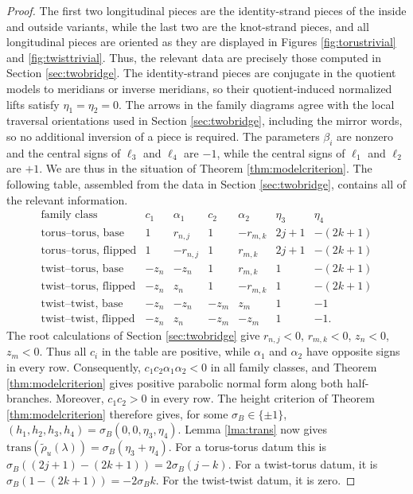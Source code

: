 \documentclass{article}
\theoremstyle{plain}
\theoremstyle{definition}
\theoremstyle{plain}
\theoremstyle{plain}
\theoremstyle{plain}
\theoremstyle{remark}
\theoremstyle{remark}
\theoremstyle{plain}
\theoremstyle{plain}
\theoremstyle{plain}
\theoremstyle{plain}
\begin{document}
\begin{proof}
The first two longitudinal pieces are the identity-strand pieces of the inside and outside variants, while the last two are the knot-strand pieces, and all longitudinal pieces are oriented as they are displayed in Figures \ref{fig:torustrivial} and \ref{fig:twisttrivial}. Thus, the relevant data are precisely those computed in Section \ref{sec:twobridge}. The identity-strand pieces are conjugate in the quotient models to meridians or inverse meridians, so their quotient-induced normalized lifts satisfy $\eta_1 = \eta_2 = 0$. The arrows in the family diagrams agree with the local traversal orientations used in Section \ref{sec:twobridge}, including the mirror words, so no additional inversion of a piece is required. The parameters $\beta_i$ are nonzero and the central signs of $\ell_3$ and $\ell_4$ are $-1$, while the central signs of $\ell_1$ and $\ell_2$ are $+1$. We are thus in the situation of Theorem \ref{thm:modelcriterion}. The following table, assembled from the data in Section \ref{sec:twobridge}, contains all of the relevant information.
\[
\begin{array}{c|cc|cc|cc}
	\text{family class}
	&
	c_1&\alpha_1
	&
	c_2&\alpha_2
	&
	\eta_3&\eta_4
	\\ \hline
	\text{torus--torus, base}
	&
	1&r_{n,j}
	&
	1&-r_{m,k}
	&
	2j+1&-(2k+1)
	\\
	\text{torus--torus, flipped}
	&
	1&-r_{n,j}
	&
	1&r_{m,k}
	&
	2j+1&-(2k+1)
	\\
	\text{twist--torus, base}
	&
	-z_n&-z_n
	&
	1&r_{m,k}
	&
	1&-(2k+1)
	\\
	\text{twist--torus, flipped}
	&
	-z_n&z_n
	&
	1&-r_{m,k}
	&
	1&-(2k+1)
	\\
	\text{twist--twist, base}
	&
	-z_n&-z_n
	&
	-z_m&z_m
	&
	1&-1
	\\
	\text{twist--twist, flipped}
	&
	-z_n&z_n
	&
	-z_m&-z_m
	&
	1&-1 .
\end{array}
\]
The root calculations of Section \ref{sec:twobridge} give $r_{n,j} < 0$, $r_{m,k} < 0$, $z_n < 0$, $z_m < 0$. Thus all $c_i$ in the table are positive, while $\alpha_1$ and $\alpha_2$ have opposite signs in every row. Consequently, $c_1c_2\alpha_1\alpha_2 < 0$ in all family classes, and Theorem \ref{thm:modelcriterion} gives positive parabolic normal form along both half-branches. Moreover, $c_1c_2 > 0$ in every row. The height criterion of Theorem \ref{thm:modelcriterion} therefore gives, for some $\sigma_B\in \{\pm 1\}$, $(h_1, h_2, h_3, h_4) = \sigma_B(0, 0, \eta_3, \eta_4)$. Lemma \ref{lma:trans} now gives $\mathrm{trans}(\widetilde\rho_u(\lambda)) = \sigma_B(\eta_3 + \eta_4)$. For a torus-torus datum this is $\sigma_B((2j+1) - (2k+1)) = 2\sigma_B(j-k)$. For a twist-torus datum, it is $\sigma_B(1-(2k+1)) = -2\sigma_Bk$. For the twist-twist datum, it is zero. 
\end{proof}
\end{document}
